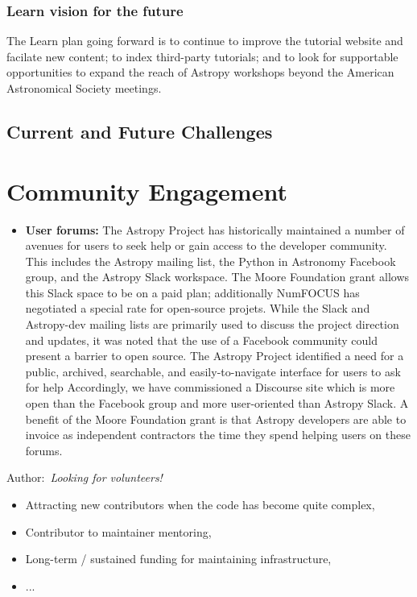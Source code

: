 \documentclass[modern]{aastex631}
\newcommand{\secunfilled}{{\color{red}Author:~\textit{Looking for volunteers!}}}
\begin{document}
\subsubsection{Learn vision for the future}

The Learn plan going forward is to continue to improve the tutorial website and
facilate new content;
to index third-party tutorials; and to look for supportable opportunities to
expand the reach of Astropy workshops beyond the American Astronomical Society
meetings.



\subsection{Current and Future Challenges}

\section{Community Engagement}

\begin{itemize}
\item {\bf User forums:} The Astropy Project has historically maintained a number of avenues for users to seek help or gain access to the developer community. This includes the Astropy mailing list, the Python in Astronomy Facebook group, and the Astropy Slack workspace. The Moore Foundation grant allows this Slack space to
be on a paid plan; additionally NumFOCUS has negotiated a special rate for
open-source projets. While the Slack and Astropy-dev mailing lists are primarily used to discuss the project direction and updates, it was noted that the use of a Facebook community could present a barrier to open source. The Astropy Project identified a need for a public, archived, searchable, and easily-to-navigate interface for users to ask for help Accordingly, we have commissioned
a Discourse site which is more open than the Facebook group and more user-oriented
than Astropy Slack. A benefit of the Moore Foundation grant is that Astropy
developers are able to invoice as independent contractors the time they
spend helping users on these forums.
\end{itemize}
\secunfilled

\begin{itemize}
\item Attracting new contributors when the code has become quite complex,
\item Contributor to maintainer mentoring,
\item Long-term / sustained funding for maintaining infrastructure,
\item ...
\end{itemize}
\end{document}
